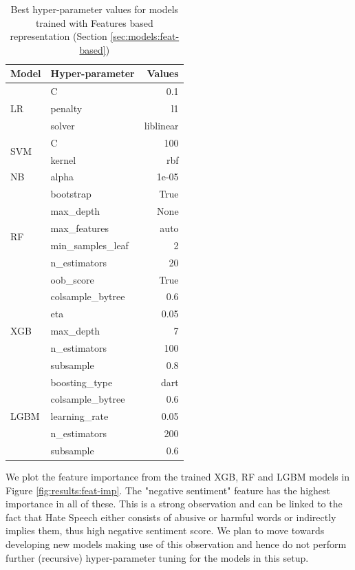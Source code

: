 \begin{table}[htbp]
\centering
\begin{tabular}{llr}
\hline
\textbf{Model} & \textbf{Hyper-parameter} & \textbf{Values} \\ \hline
\multirow{3}{*}{LR} & C & 0.1 \\
 & penalty & l1 \\
 & solver & liblinear \\
 \hline
\multirow{2}{*}{SVM} & C & 100 \\
 & kernel & rbf \\
 \hline
NB & alpha & 1e-05 \\
 \hline
\multirow{6}{*}{RF} & bootstrap & True \\
 & max\_depth & None \\
 & max\_features & auto \\
 & min\_samples\_leaf & 2 \\
 & n\_estimators & 20 \\
 & oob\_score & True \\
 \hline
\multirow{5}{*}{XGB} & colsample\_bytree & 0.6 \\
 & eta & 0.05 \\
 & max\_depth & 7 \\
 & n\_estimators & 100 \\
 & subsample & 0.8 \\
 \hline
\multirow{5}{*}{LGBM} & boosting\_type & dart \\
 & colsample\_bytree & 0.6 \\
 & learning\_rate & 0.05 \\
 & n\_estimators & 200 \\
 & subsample & 0.6 \\ \hline
\end{tabular}
\caption{Best hyper-parameter values for models trained with Features based representation (Section \ref{sec:models:feat-based})}
\label{tab:best-hparams-feat-based}
\end{table}

We plot the feature importance from the trained \ac{XGB}, \ac{RF} and \ac{LGBM} models in Figure \ref{fig:results:feat-imp}. The "negative sentiment" feature has the highest importance in all of these. This is a strong observation and can be linked to the fact that Hate Speech either consists of abusive or harmful words or indirectly implies them, thus high negative sentiment score. We plan to move towards developing new models making use of this observation and hence do not perform further (recursive) hyper-parameter tuning for the models in this setup.



